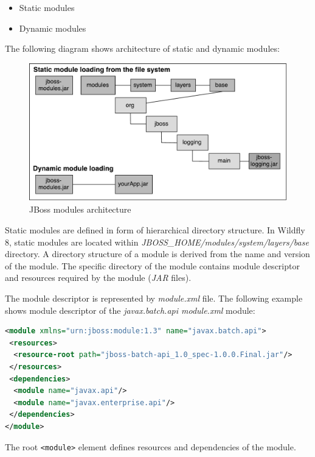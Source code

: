 \documentclass[12pt,oneside]{fithesis2}
\begin{document}
\begin{itemize}
	\item Static modules
	\item Dynamic modules
\end{itemize}

The following diagram shows architecture of static and dynamic modules:

\begin{figure}[ht!]
	\centering
	\includegraphics[width=\textwidth]{images/jboss_modules}
	\caption{JBoss modules architecture \cite{wildfly_book}}
	\label{jboss_modules_image}
\end{figure}

Static modules are defined in form of hierarchical directory structure. In Wildfly 8, static modules are located within \textit{JBOSS\_HOME/modules/system/layers/base} directory. A directory structure of a module is derived from the name and version of the module. The specific directory of the module contains module descriptor and resources required by the module (\textit{JAR} files).

The module descriptor is represented by \textit{module.xml} file. The following example shows module descriptor of the \textit{javax.batch.api module.xml} module:
\begin{lstlisting}[caption = Example of a module descriptor \cite{wildfly_book}, label = module_descriptor, language=XML]
<module xmlns="urn:jboss:module:1.3" name="javax.batch.api">
 <resources>
  <resource-root path="jboss-batch-api_1.0_spec-1.0.0.Final.jar"/>
 </resources>
 <dependencies>
  <module name="javax.api"/>
  <module name="javax.enterprise.api"/>
 </dependencies>    
</module>
\end{lstlisting}
\noindent	
The root \verb|<module>| element defines resources and dependencies of the module. 
\end{document}

